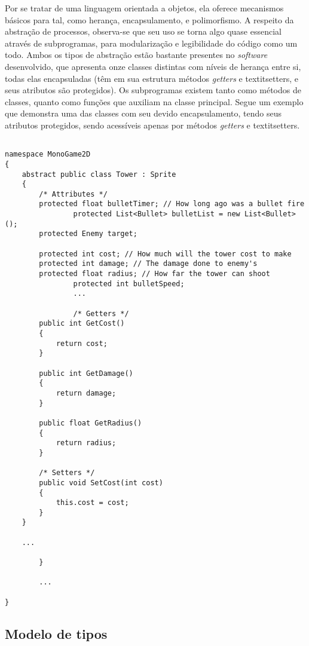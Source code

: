 \documentclass[rel_mlp]{iiufrgs}
\begin{document}
Por se tratar de uma linguagem orientada a objetos, ela oferece mecanismos básicos para tal, como herança, encapsulamento, e polimorfismo. A respeito da abstração de processos, observa-se que seu uso se torna algo quase essencial através de subprogramas, para modularização e legibilidade do código como um todo. Ambos os tipos de abstração estão bastante presentes no \textit{software} desenvolvido, que apresenta onze classes distintas com níveis de herança entre si, todas elas encapsuladas (têm em sua estrutura métodos \textit{getters} e textit{setters}, e seus atributos são protegidos). Os subprogramas existem tanto como métodos de classes, quanto como funções que auxiliam na classe principal. Segue um exemplo que demonstra uma das classes com seu devido encapsulamento, tendo seus atributos protegidos, sendo acessíveis apenas por métodos \textit{getters} e textit{setters}.


\begin{lstlisting}[caption=Trecho de código C\# retirado da implementação deste trabalho, label=lst:test]

namespace MonoGame2D
{
    abstract public class Tower : Sprite
	{
		/* Attributes */
        protected float bulletTimer; // How long ago was a bullet fire
				protected List<Bullet> bulletList = new List<Bullet>();
        protected Enemy target;

        protected int cost; // How much will the tower cost to make
        protected int damage; // The damage done to enemy's
        protected float radius; // How far the tower can shoot
				protected int bulletSpeed;
				...
				
				/* Getters */
        public int GetCost()
		{
            return cost;
        }

        public int GetDamage()
        {
            return damage;
		}

        public float GetRadius()
        {
			return radius;
		}

		/* Setters */
		public void SetCost(int cost)
		{
            this.cost = cost;
        }
	}
	
	...
				
		}
		
		...
		
}

\end{lstlisting}

\subsection{Modelo de tipos}
\end{document}
